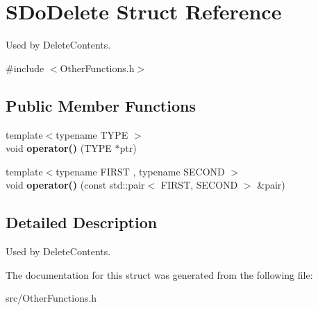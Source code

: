 \section{SDoDelete Struct Reference}
\label{structSDoDelete}


Used by DeleteContents.  


{\ttfamily \#include $<$OtherFunctions.h$>$}\subsection*{Public Member Functions}
\begin{DoxyCompactItemize}
\item 
{\footnotesize template$<$typename TYPE $>$ }\\void {\bfseries operator()} (TYPE $\ast$ptr)\label{structSDoDelete_ab2d8c0dcfdddbd43735d8726de71af31}

\item 
{\footnotesize template$<$typename FIRST , typename SECOND $>$ }\\void {\bfseries operator()} (const std::pair$<$ FIRST, SECOND $>$ \&pair)\label{structSDoDelete_ae3363cc96fd135b28dc510d9ceb1a81c}

\end{DoxyCompactItemize}


\subsection{Detailed Description}
Used by DeleteContents. 

The documentation for this struct was generated from the following file:\begin{DoxyCompactItemize}
\item 
src/OtherFunctions.h\end{DoxyCompactItemize}
